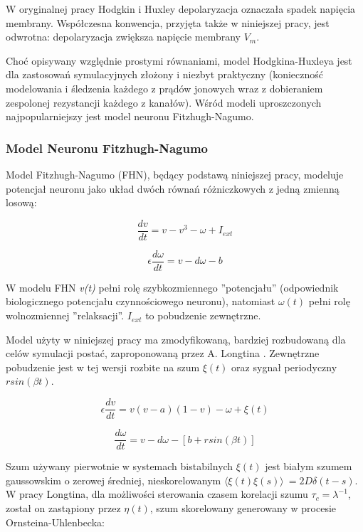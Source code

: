   W oryginalnej pracy Hodgkin i Huxley depolaryzacja oznaczała spadek napięcia membrany. Współczesna konwencja, przyjęta także w niniejszej pracy, jest odwrotna: depolaryzacja zwiększa napięcie membrany $V_{m}$.

  Choć opisywany względnie prostymi równaniami, model Hodgkina-Huxleya jest dla zastosowań symulacyjnych złożony i niezbyt praktyczny (konieczność modelowania i śledzenia każdego z prądów jonowych wraz z dobieraniem zespolonej rezystancji każdego z kanałów). Wśród modeli uproszczonych najpopularniejszy jest model neuronu Fitzhugh-Nagumo.


  \subsubsection{Model Neuronu Fitzhugh-Nagumo}

  Model Fitzhugh-Nagumo (FHN), będący podstawą niniejszej pracy, modeluje potencjał neuronu jako układ dwóch równań różniczkowych z jedną zmienną losową:

  \begin{equation}
    \frac{dv}{dt} = v - v^3 - \omega + I_{ext}
  \end{equation}

  \begin{equation}
    \epsilon \frac{d \omega}{dt} = v - d \omega - b
  \end{equation}

  W modelu FHN \emph{v(t)} pełni rolę szybkozmiennego ''potencjału'' (odpowiednik biologicznego potencjału czynnościowego neuronu), natomiast $\omega (t)$ pełni rolę wolnozmiennej ''relaksacji''. $I_{ext}$ to pobudzenie zewnętrzne.


  Model użyty w niniejszej pracy ma zmodyfikowaną, bardziej rozbudowaną dla celów symulacji postać, zaproponowaną przez A. Longtina \cite{longtin}. Zewnętrzne pobudzenie jest w tej wersji rozbite na szum $\xi(t)$ oraz sygnał periodyczny $r sin(\beta t)$.

  \begin{equation} \label{eq:v}
    \epsilon \frac{dv}{dt} = v(v-a)(1-v)- \omega + \xi(t)
  \end{equation}

  \begin{equation} \label{eq:w}
    \frac{d \omega}{dt} = v - d \omega - [b + r sin(\beta t)]
  \end{equation}

  Szum używany pierwotnie w systemach bistabilnych $\xi(t)$ jest białym szumem gaussowskim o zerowej średniej, nieskorelowanym $\langle \xi(t) \xi(s) \rangle\ = 2 D \delta (t-s)$. W pracy Longtina,  dla możliwości sterowania czasem korelacji szumu $\tau_c = \lambda^{-1}$, został on zastąpiony przez $\eta(t)$, szum skorelowany generowany w procesie Ornsteina-Uhlenbecka:

